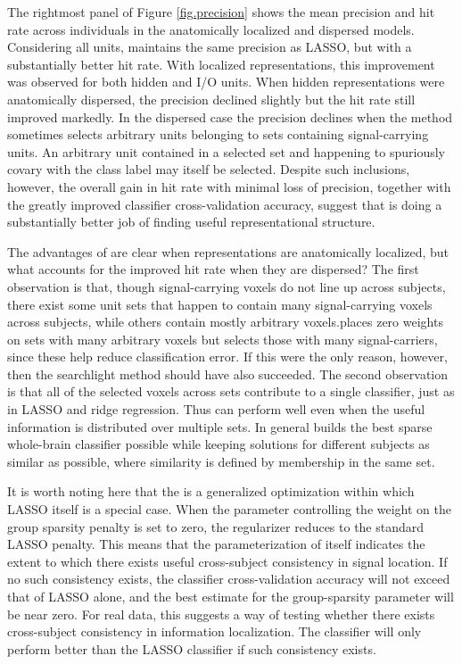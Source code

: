 The rightmost panel of Figure \ref{fig.precision} shows the mean precision and hit rate across individuals in the anatomically localized and dispersed models. Considering all units, \soslasso maintains the same precision as LASSO, but with a substantially better hit rate. With localized representations, this improvement was observed for both hidden and I/O units. When hidden representations were anatomically dispersed, the precision declined slightly but the hit rate still improved markedly. In the dispersed case the precision declines when the method sometimes selects arbitrary units belonging to sets containing signal-carrying units. An arbitrary unit contained in a selected set and happening to spuriously covary with the class label may itself be selected. Despite such inclusions, however, the overall gain in hit rate with minimal loss of precision, together with the greatly improved classifier cross-validation accuracy, suggest that \soslasso is doing a substantially better job of finding useful representational structure.

The advantages of \soslasso are clear when representations are anatomically localized, but what accounts for the improved hit rate when they are dispersed? The first observation is that, though signal-carrying voxels do not line up across subjects, there exist some unit sets that happen to contain many signal-carrying voxels across subjects, while others contain mostly arbitrary voxels.\soslasso places zero weights on sets with many arbitrary voxels but selects those with many signal-carriers, since these help reduce classification error. If this were the only reason, however, then the searchlight method should have also succeeded. The second observation is that all of the selected voxels across sets contribute to a single classifier, just as in LASSO and ridge regression. Thus \soslasso can perform well even when the useful information is distributed over multiple sets. In general \soslasso builds the best sparse whole-brain classifier possible while keeping solutions for different subjects as similar as possible, where similarity is defined by membership in the same set.

It is worth noting here that the \soslasso is a generalized optimization within which LASSO itself is a special case. When the parameter controlling the weight on the group sparsity penalty is set to zero, the regularizer reduces to the standard LASSO penalty. This means that the parameterization of \soslasso itself indicates the extent to which there exists useful cross-subject consistency in signal location. If no such consistency exists, the classifier cross-validation accuracy will not exceed that of LASSO alone, and the best estimate for the group-sparsity parameter will be near zero. For real data, this suggests a way of testing whether there exists cross-subject consistency in information localization. The \soslasso classifier will only perform better than the LASSO classifier if such consistency exists.

